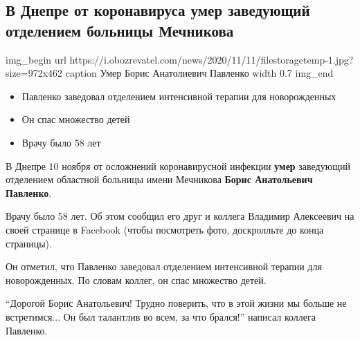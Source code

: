  
 
 

\subsection{В Днепре от коронавируса умер заведующий отделением больницы Мечникова}
\label{sec:11_11_2020.news.ua.obozrevatel.1.kovid_death.pavlenko_vrach_dnepr}



\ifcmt
img_begin 
	url https://i.obozrevatel.com/news/2020/11/11/filestoragetemp-1.jpg?size=972x462
	caption Умер Борис Анатолиевич Павленко
	width 0.7
img_end
\fi

\begin{itemize}
	\item Павленко заведовал отделением интенсивной терапии для новорожденных
	\item Он спас множество детей
	\item Врачу было 58 лет
\end{itemize}

В Днепре 10 ноября от осложнений коронавирусной инфекции \textbf{умер} заведующий
отделением областной больницы имени Мечникова \textbf{Борис Анатольевич Павленко}.

Врачу было 58 лет. Об этом сообщил его друг и коллега Владимир Алексеевич на
своей странице в Facebook (чтобы посмотреть фото, доскролльте до конца
страницы).

Он отметил, что Павленко заведовал отделением интенсивной терапии для
новорожденных. По словам коллег, он спас множество детей.

\enquote{Дорогой Борис Анатольевич! Трудно поверить, что в этой жизни мы больше не
встретимся... Он был талантлив во всем, за что брался!} \dshM написал коллега
Павленко.

